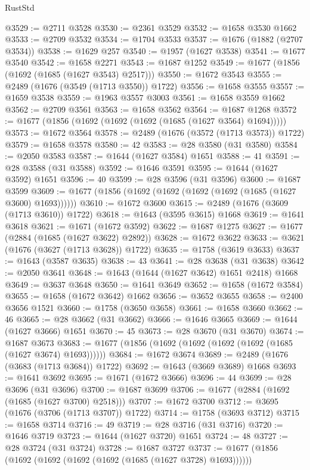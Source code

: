 \begin{lexlean}{RustStd}
\begin{coremodule}
@3529 := @2711 @3528
@3530 := @2361 @3529
@3532 := @1658 @3530 @1662
@3533 := @2709 @3532
@3534 := @1704 @3533
@3537 := @1676 (@1882 (@2707 @3534))
@3538 := @1629 @257
@3540 := @1957 (@1627 @3538)
@3541 := @1677 @3540
@3542 := @1658 @2271
@3543 := @1687 @1252
@3549 := @1677 (@1856 (@1692 (@1685 (@1627 @3543) @2517)))
@3550 := @1672 @3543
@3555 := @2489 (@1676 (@3549 (@1713 @3550)) @1722)
@3556 := @1658 @3555
@3557 := @1659 @3538
@3559 := @1963 @3557 @3003
@3561 := @1658 @3559 @1662
@3562 := @2709 @3561
@3563 := @1658 @3562
@3564 := @1687 @1268
@3572 := @1677 (@1856 (@1692 (@1692 (@1692 (@1685 (@1627 @3564) @1694)))))
@3573 := @1672 @3564
@3578 := @2489 (@1676 (@3572 (@1713 @3573)) @1722)
@3579 := @1658 @3578
@3580 := 42
@3583 := @28 @3580 (@31 @3580)
@3584 := @2050 @3583
@3587 := @1644 (@1627 @3584) @1651
@3588 := 41
@3591 := @28 @3588 (@31 @3588)
@3592 := @1646 @3591
@3595 := @1644 (@1627 @3592) @1651
@3596 := 40
@3599 := @28 @3596 (@31 @3596)
@3600 := @1687 @3599
@3609 := @1677 (@1856 (@1692 (@1692 (@1692 (@1692 (@1685 (@1627 @3600) @1693))))))
@3610 := @1672 @3600
@3615 := @2489 (@1676 (@3609 (@1713 @3610)) @1722)
@3618 := @1643 (@3595 @3615) @1668
@3619 := @1641 @3618
@3621 := @1671 (@1672 @3592)
@3622 := @1687 @1275
@3627 := @1677 (@2884 (@1685 (@1627 @3622) @2892))
@3628 := @1672 @3622
@3633 := @3621 (@1676 (@3627 (@1713 @3628)) @1722)
@3635 := @1758 (@3619 @3633)
@3637 := @1643 (@3587 @3635)
@3638 := 43
@3641 := @28 @3638 (@31 @3638)
@3642 := @2050 @3641
@3648 := @1643 (@1644 (@1627 @3642) @1651 @2418) @1668
@3649 := @3637 @3648
@3650 := @1641 @3649
@3652 := @1658 (@1672 @3584)
@3655 := @1658 (@1672 @3642) @1662
@3656 := @3652 @3655
@3658 := @2400 @3656 @1521
@3660 := @1758 (@3650 @3658)
@3661 := @1658 @3660
@3662 := 46
@3665 := @28 @3662 (@31 @3662)
@3666 := @1646 @3665
@3669 := @1644 (@1627 @3666) @1651
@3670 := 45
@3673 := @28 @3670 (@31 @3670)
@3674 := @1687 @3673
@3683 := @1677 (@1856 (@1692 (@1692 (@1692 (@1692 (@1685 (@1627 @3674) @1693))))))
@3684 := @1672 @3674
@3689 := @2489 (@1676 (@3683 (@1713 @3684)) @1722)
@3692 := @1643 (@3669 @3689) @1668
@3693 := @1641 @3692
@3695 := @1671 (@1672 @3666)
@3696 := 44
@3699 := @28 @3696 (@31 @3696)
@3700 := @1687 @3699
@3706 := @1677 (@2884 (@1692 (@1685 (@1627 @3700) @2518)))
@3707 := @1672 @3700
@3712 := @3695 (@1676 (@3706 (@1713 @3707)) @1722)
@3714 := @1758 (@3693 @3712)
@3715 := @1658 @3714
@3716 := 49
@3719 := @28 @3716 (@31 @3716)
@3720 := @1646 @3719
@3723 := @1644 (@1627 @3720) @1651
@3724 := 48
@3727 := @28 @3724 (@31 @3724)
@3728 := @1687 @3727
@3737 := @1677 (@1856 (@1692 (@1692 (@1692 (@1692 (@1685 (@1627 @3728) @1693))))))

\end{coremodule}
\end{lexlean}
